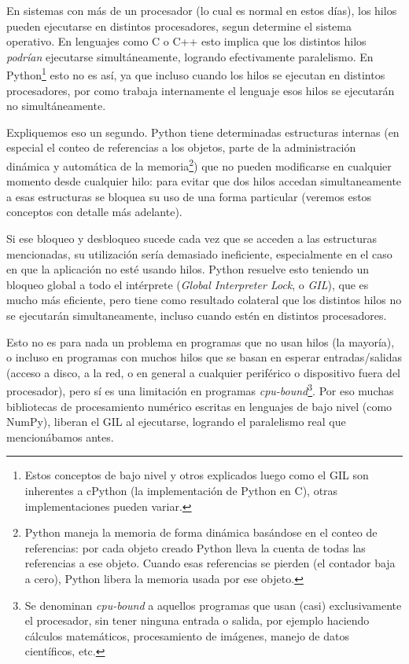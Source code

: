 En sistemas con más de un procesador (lo cual es normal en estos días), los hilos pueden ejecutarse en distintos procesadores, segun determine el sistema operativo. En lenguajes como C o C++ esto implica que los distintos hilos \textit{podrían} ejecutarse simultáneamente, logrando efectivamente paralelismo. En Python\footnote{Estos conceptos de bajo nivel y otros explicados luego como el GIL son inherentes a cPython (la implementación de Python en C), otras implementaciones pueden variar.} esto no es así, ya que incluso cuando los hilos se ejecutan en distintos procesadores, por como trabaja internamente el lenguaje esos hilos se ejecutarán no simultáneamente.

Expliquemos eso un segundo. Python tiene determinadas estructuras internas (en especial el conteo de referencias a los objetos, parte de la administración dinámica y automática de la memoria\footnote{Python maneja la memoria de forma dinámica basándose en el conteo de referencias: por cada objeto creado Python lleva la cuenta de todas las referencias a ese objeto. Cuando esas referencias se pierden (el contador baja a cero), Python libera la memoria usada por ese objeto.}) que no pueden modificarse en cualquier momento desde cualquier hilo: para evitar que dos hilos accedan simultaneamente a esas estructuras se bloquea su uso de una forma particular (veremos estos conceptos con detalle más adelante).

Si ese bloqueo y desbloqueo sucede cada vez que se acceden a las estructuras mencionadas, su utilización sería demasiado ineficiente, especialmente en el caso en que la aplicación no esté usando hilos. Python resuelve esto teniendo un bloqueo global a todo el intérprete (\textit{Global Interpreter Lock}, o \textit{GIL}), que es mucho más eficiente, pero tiene como resultado colateral que los distintos hilos no se ejecutarán simultaneamente, incluso cuando estén en distintos procesadores.

Esto no es para nada un problema en programas que no usan hilos (la mayoría), o incluso en programas con muchos hilos que se basan en esperar entradas/salidas (acceso a disco, a la red, o en general a cualquier periférico o dispositivo fuera del procesador), pero sí es una limitación en programas \textit{cpu-bound}\footnote{Se denominan \textit{cpu-bound} a aquellos programas que usan (casi) exclusivamente el procesador, sin tener ninguna entrada o salida, por ejemplo haciendo cálculos matemáticos, procesamiento de imágenes, manejo de datos científicos, etc.}. Por eso muchas bibliotecas de procesamiento numérico escritas en lenguajes de bajo nivel (como NumPy), liberan el GIL al ejecutarse, logrando el paralelismo real que mencionábamos antes.


